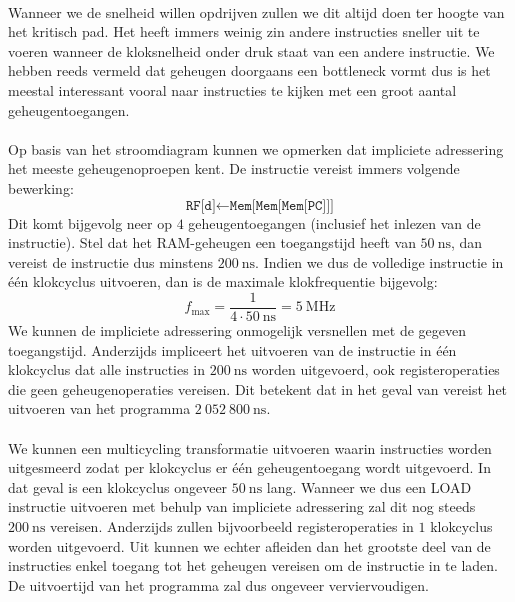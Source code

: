 \paragraph{}
Wanneer we de snelheid willen opdrijven zullen we dit altijd doen ter hoogte van het kritisch pad. Het heeft immers weinig zin andere instructies sneller uit te voeren wanneer de kloksnelheid onder druk staat van een andere instructie. We hebben reeds vermeld dat geheugen doorgaans een bottleneck vormt dus is het meestal interessant vooral naar instructies te kijken met een groot aantal geheugentoegangen.
\paragraph{}
Op basis van het stroomdiagram kunnen we opmerken dat impliciete adressering het meeste geheugenoproepen kent. De instructie vereist immers volgende bewerking:
\begin{equation}
\texttt{RF[d]}\leftarrow\texttt{Mem[Mem[Mem[PC]]]}
\end{equation}
Dit komt bijgevolg neer op $4$ geheugentoegangen (inclusief het inlezen van de instructie). Stel dat het RAM-geheugen een toegangstijd heeft van $50~\mbox{ns}$, dan vereist de instructie dus minstens $200~\mbox{ns}$. Indien we dus de volledige instructie in \'e\'en klokcyclus uitvoeren, dan is de maximale klokfrequentie bijgevolg:
\begin{equation}
f_{\mbox{max}}=\displaystyle\frac{1}{4\cdot 50~\mbox{ns}}=5~\mbox{MHz}
\end{equation}
We kunnen de impliciete adressering onmogelijk versnellen met de gegeven toegangstijd. Anderzijds impliceert het uitvoeren van de instructie in \'e\'en klokcyclus dat alle instructies in $200~\mbox{ns}$ worden uitgevoerd, ook registeroperaties die geen geheugenoperaties vereisen. Dit betekent dat in het geval van vereist het uitvoeren van het programma $2\ 052\ 800~\mbox{ns}$.
\paragraph{}
We kunnen een multicycling transformatie uitvoeren waarin instructies worden uitgesmeerd zodat per klokcyclus er \'e\'en geheugentoegang wordt uitgevoerd. In dat geval is een klokcyclus ongeveer $50~\mbox{ns}$ lang. Wanneer we dus een LOAD instructie uitvoeren met behulp van impliciete adressering zal dit nog steeds $200~\mbox{ns}$ vereisen. Anderzijds zullen bijvoorbeeld registeroperaties in $1$ klokcyclus worden uitgevoerd. Uit  kunnen we echter afleiden dan het grootste deel van de instructies enkel toegang tot het geheugen vereisen om de instructie in te laden. De uitvoertijd van het programma zal dus ongeveer verviervoudigen.
